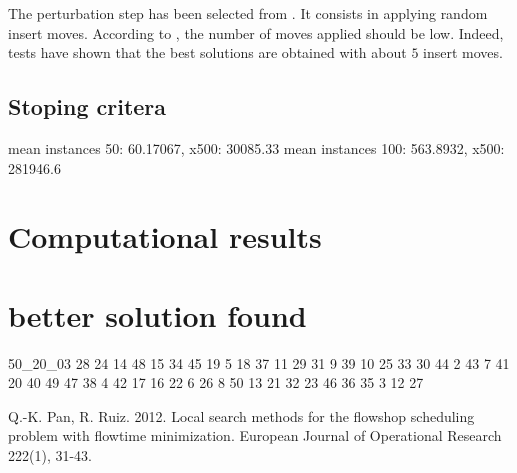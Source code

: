 \documentclass{article}
\begin{document}
The perturbation step has been selected from \cite{ref}.
It consists in applying random insert moves.
According to \cite{ref}, the number of moves applied should be low.
Indeed, tests have shown that the best solutions are obtained with about $5$ insert moves.

\subsection{Stoping critera}

mean instances 50: 60.17067, x500: 30085.33\newline
mean instances 100: 563.8932, x500: 281946.6

\section{Computational results}



\section{better solution found}

50\_20\_03  28 24 14 48 15 34 45 19 5 18 37 11 29 31 9 39 10 25 33 30 44 2 43 7 41 20 40 49 47 38 4 42 17 16 22 6 26 8 50 13 21 32 23 46 36 35 3 12 27 

\begin{thebibliography}{12}

 Q.-K. Pan, R. Ruiz.
2012.
Local search methods for the flowshop scheduling problem with flowtime minimization.
European Journal of Operational Research 222(1), 31-43.

\end{thebibliography}
\end{document}
